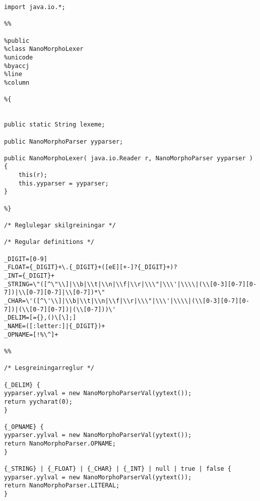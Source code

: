 \documentclass[]{article}
\begin{document}
\begin{lstlisting}
import java.io.*;

%%

%public
%class NanoMorphoLexer
%unicode
%byaccj
%line
%column

%{


public static String lexeme;

public NanoMorphoParser yyparser;

public NanoMorphoLexer( java.io.Reader r, NanoMorphoParser yyparser )
{
	this(r);
	this.yyparser = yyparser;
}

%}

/* Reglulegar skilgreiningar */

/* Regular definitions */

_DIGIT=[0-9]
_FLOAT={_DIGIT}+\.{_DIGIT}+([eE][+-]?{_DIGIT}+)?
_INT={_DIGIT}+
_STRING=\"([^\"\\]|\\b|\\t|\\n|\\f|\\r|\\\"|\\\'|\\\\|(\\[0-3][0-7][0-7])|\\[0-7][0-7]|\\[0-7])*\"
_CHAR=\'([^\'\\]|\\b|\\t|\\n|\\f|\\r|\\\"|\\\'|\\\\|(\\[0-3][0-7][0-7])|(\\[0-7][0-7])|(\\[0-7]))\'
_DELIM=[={},()\[\];]
_NAME=([:letter:]|{_DIGIT})+
_OPNAME=[!%\^]+

%%

/* Lesgreiningarreglur */

{_DELIM} {
yyparser.yylval = new NanoMorphoParserVal(yytext());
return yycharat(0);
}

{_OPNAME} {
yyparser.yylval = new NanoMorphoParserVal(yytext());
return NanoMorphoParser.OPNAME;
}

{_STRING} | {_FLOAT} | {_CHAR} | {_INT} | null | true | false {
yyparser.yylval = new NanoMorphoParserVal(yytext());
return NanoMorphoParser.LITERAL;
}


\end{lstlisting}
\end{document}
